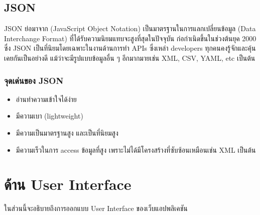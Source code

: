 
\subsection{JSON}
JSON \cite{web:json} ย่อมาจาก (JavaScript Object Notation) เป็นมาตรฐานในการแลกเปลี่ยนข้อมูล (Data Interchange Format) ที่ได้รับความนิยมแทบจะสูงที่สุดในปัจจุบัน ก่อกำเนิดขึ้นในช่วงต้นยุค 2000 ซึ่ง JSON เป็นที่นิยมโดยเฉพาะในงานด้านการทำ APIs ซึ่งเหล่า developers ทุกคนคงรู้จักและคุ้นเคยกันเป็นอย่างดี แม้ว่าจะมีรูปแบบข้อมูลอื่น ๆ อีกมากมายเช่น XML, CSV, YAML, etc เป็นต้น
\subsubsection{จุดเด่นของ JSON}
\begin{itemize}
    \item อ่านทำความเข้าใจได้ง่าย
    \item มีความเบา (lightweight)
    \item มีความเป็นมาตรฐานสูง และเป็นที่นิยมสูง
    \item มีความเร็วในการ access ข้อมูลที่สูง เพราะไม่ได้มีโครงสร้างที่ซับซ้อนเหมือนเช่น XML เป็นต้น
\end{itemize}





\section{ด้าน User Interface}
ในส่วนนี้จะอธิบายถึงการออกแบบ User Interface ของเว็บแอปพลิเคชัน

